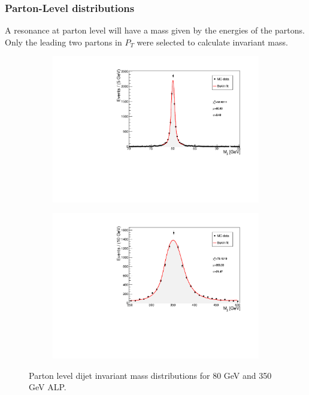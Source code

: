 \documentclass[12pt,a4paper]{article}
\begin{document}
\subsubsection{Parton-Level distributions}
A resonance at parton level will have a mass given by the energies of the partons. Only the leading two partons in $P_T$ were selected to calculate invariant mass.

\begin{figure}[h!]
	\begin{subfigure}{7.4cm}
	\centering\includegraphics[scale=0.4]{parton_level_80_fit.pdf}
	\end{subfigure}
	\begin{subfigure}{7.4cm}
	\centering\includegraphics[scale=0.4]{parton_level_350_fit.pdf}
	\end{subfigure}
\caption{Parton level dijet invariant mass distributions for 80 GeV and 350 GeV ALP.}
\label{fig:figure5}	
\end{figure}
\end{document}
